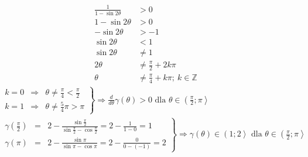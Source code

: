 \begin{enumerate}
\begin{align*}
        	\frac{
        		1
        	}{
        		1 - \sin 2\theta
        	} & > 0\\
        	1 - \sin 2\theta & > 0\\
        	 -\sin 2\theta & > -1\\
        	 \sin 2\theta & < 1\\
        	 \sin 2\theta & \neq 1\\
        	 2\theta & \neq \frac{\pi}{2} + 2k\pi\\
        	 \theta & \neq \frac{\pi}{4} + k\pi ; \ k \in \mathbb{Z}
        \end{align*}
       	\begin{align*}
       		\left. \begin{array}{rcl}
       		 k = 0 & \Rightarrow & \theta \neq \frac{\pi}{4} < \frac{\pi}{2}  \\
    	 	 k = 1 & \Rightarrow &\theta \neq \frac{5}{4}\pi > \pi
    	 	\end{array}    \right\}\Rightarrow \frac{d}{d\theta}\gamma\left( \theta\right) > 0 \text{ dla } \theta \in \left( \frac{\pi}{2};\pi\right\rangle& \hspace{10cm}
        \end{align*}
       	\begin{align*}
       	\left. \begin{array}{rcl}
       		\gamma\left( \frac{\pi}{2}\right) & = &
       		 2 - \frac{\sin \frac{\pi}{2}}{\sin \frac{\pi}{2} - \cos \frac{\pi}{2}} 
       		 =2 - \frac{1}{1 - 0} = 1\\	
       		\gamma\left( \pi\right) & = &
       		2 - \frac{\sin  \pi}{\sin  \pi - \cos \pi} = 2 - \frac{0}{0 - \left(-1\right)}= 2
       	\end{array} \right\} \Rightarrow \gamma\left( \theta\right) \in \left( 1;2\right\rangle \text{ dla } \theta \in \left( \frac{\pi}{2};\pi\right\rangle& \hspace{10cm}
        \end{align*}
		\end{enumerate}
